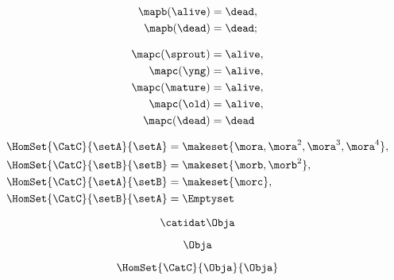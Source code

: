 \begin{forslides}
        
         \begin{equation}
            \label{eq:83}
            \begin{aligned}
            \mapb(\alive) & =  \dead, \\
            \mapb(\dead)  & =  \dead;
        \end{aligned}
        \end{equation}
        
        
         \begin{equation}
            \label{eq:84}
            \begin{aligned}
            \mapc(\sprout) & = \alive, \\
            \mapc(\yng)    & =  \alive, \\
            \mapc(\mature) & = \alive , \\
            \mapc( \old)   & = \alive, \\
            \mapc (\dead)  & = \dead
        \end{aligned}
        \end{equation}
        
        
               \begin{equation}
            \label{eq:85}
            \begin{aligned}
            \HomSet{\CatC}{\setA}{\setA} & = \makeset{ \mora, \mora^2, \mora^3, \mora^4 }, \\
            \HomSet{\CatC}{\setB}{\setB} & =  \makeset{ \morb, \morb^2 }, \\
            \HomSet{\CatC}{\setA}{\setB} & =  \makeset{ \morc }, \\
            \HomSet{\CatC}{\setB}{\setA} & = \Emptyset
        \end{aligned}
        \end{equation}
        
        
         \begin{equation}
            \label{eq:86}
            \catidat\Obja
        \end{equation}
        
        
         \begin{equation}
            \label{eq:87}
            \Obja
        \end{equation}
        
        
         \begin{equation}
            \label{eq:88}
            \HomSet{\CatC}{\Obja}{\Obja}
        \end{equation}
        

\end{forslides}
